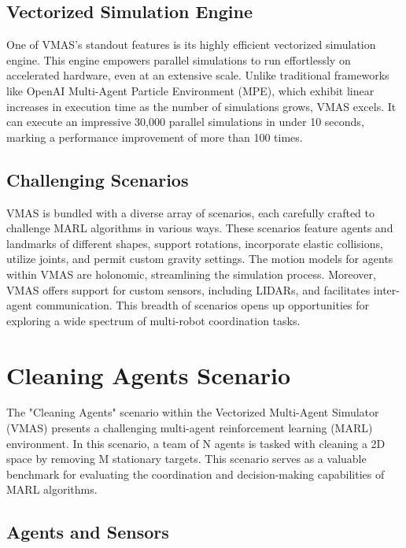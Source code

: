 \documentclass{scrartcl}
\begin{document}
\subsection{Vectorized Simulation Engine}

One of VMAS's standout features is its highly efficient vectorized simulation engine. This engine empowers parallel simulations to run effortlessly on accelerated hardware, even at an extensive scale. Unlike traditional frameworks like OpenAI Multi-Agent Particle Environment (MPE), which exhibit linear increases in execution time as the number of simulations grows, VMAS excels. It can execute an impressive 30,000 parallel simulations in under 10 seconds, marking a performance improvement of more than 100 times.

\subsection{Challenging Scenarios}

VMAS is bundled with a diverse array of scenarios, each carefully crafted to challenge MARL algorithms in various ways. These scenarios feature agents and landmarks of different shapes, support rotations, incorporate elastic collisions, utilize joints, and permit custom gravity settings. The motion models for agents within VMAS are holonomic, streamlining the simulation process. Moreover, VMAS offers support for custom sensors, including LIDARs, and facilitates inter-agent communication. This breadth of scenarios opens up opportunities for exploring a wide spectrum of multi-robot coordination tasks.

\newpage

\section{Cleaning Agents Scenario}

The "Cleaning Agents" scenario within the Vectorized Multi-Agent Simulator (VMAS) presents a challenging multi-agent reinforcement learning (MARL) environment. In this scenario, a team of N agents is tasked with cleaning a 2D space by removing M stationary targets. This scenario serves as a valuable benchmark for evaluating the coordination and decision-making capabilities of MARL algorithms.

\subsection{Agents and Sensors}
\end{document}
